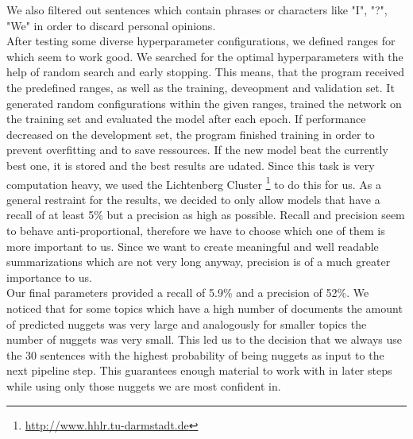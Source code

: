 We also filtered out sentences which contain phrases or characters like "I", "?", "We" in order to discard personal opinions.\\
After testing some diverse hyperparameter configurations, we defined ranges for which seem to work good. We searched for the optimal hyperparameters with the help of random search and early stopping. This means, that the program received the predefined ranges, as well as the training, deveopment and validation set. It generated random configurations within the given ranges, trained the network on the training set and evaluated the model after each epoch. If performance decreased on the development set, the program finished training in order to prevent overfitting and to save ressources. If the new model beat the currently best one, it is stored and the best results are udated. Since this task is very computation heavy, we used the Lichtenberg Cluster \footnote[4]{\url{http://www.hhlr.tu-darmstadt.de}} to do this for us. As a general restraint for the results, we decided to only allow models that have a recall of at least 5\% but a precision as high as possible. Recall and precision seem to behave anti-proportional, therefore we have to choose which one of them is more important to us. Since we want to create meaningful and well readable summarizations which are not very long anyway, precision is of a much greater importance to us. \\
Our final parameters provided a recall of 5.9\% and a precision of 52\%. We noticed that for some topics which have a high number of documents the amount of predicted nuggets was very large and analogously for smaller topics the number of nuggets was very small. This led us to the decision that we always use the 30 sentences with the highest probability of being nuggets as input to the next pipeline step. This guarantees enough material to work with in later steps while using only those nuggets we are most confident in.\\

